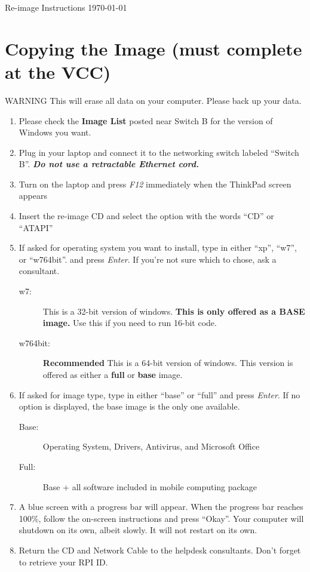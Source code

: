 \documentclass[10pt]{article}
\begin{document}
\begin{flushright}
Re-image Instructions \today
\end{flushright}
\section{Copying the Image (must complete at the VCC)}
{\sc WARNING This will erase all data on your computer. Please back up your data.}
\begin{enumerate}
\item Please check the {\bf Image List} posted near Switch B for the version of Windows you want.
\item Plug in your laptop and connect it to the networking switch labeled ``Switch B''. \emph{\bf Do not use a retractable Ethernet cord.}
\item Turn on the laptop and press \emph{F12} immediately when the ThinkPad screen appears
\item Insert the re-image CD and select the option with the words ``CD'' or ``ATAPI''
\item If asked for operating system you want to install, type in either ``xp'', ``w7'', or ``w764bit''. and press \emph{Enter}. If you're not sure which to chose, ask a consultant.
\begin{description}
\item[w7:] This is a 32-bit version of windows. {\bf This is only offered as a BASE image.} Use this if you need to run 16-bit code.
\item[w764bit:] {\bf Recommended} This is a 64-bit version of windows. This version is offered as either a {\bf full} or {\bf base} image.
\end{description}
\item If asked for image type, type in either ``base'' or ``full'' and press \emph{Enter}. If no option is displayed, the base image is the only one available.
\begin{description}
\item[Base:] Operating System, Drivers, Antivirus, and Microsoft Office
\item[Full:] Base + all software included in mobile computing package
\end{description}
\item A blue screen with a progress bar will appear. When the progress bar reaches 100\%, follow the on-screen instructions and press ``Okay''. Your computer will shutdown on its own, albeit slowly. It will not restart on its own.
\item Return the CD and Network Cable to the helpdesk consultants. Don't forget to retrieve your RPI ID.

\end{enumerate}
\end{document}
